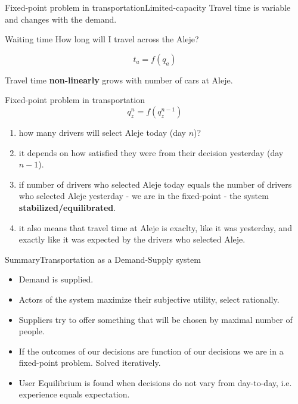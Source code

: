 \documentclass{beamer}
\begin{document}
\begin{frame}{Fixed-point problem in transportation}{Limited-capacity}
Travel time is variable and changes with the demand.
\begin{block}{Waiting time}
How long will I travel across the Aleje?
\end{block}
\begin{equation*}
t_a=f(q_a)
\end{equation*}
\begin{center}
\end{center}
Travel time \textbf{non-linearly} grows with number of cars at Aleje.
\end{frame}


\begin{frame}{Fixed-point problem in transportation}{}
\begin{equation*}
q_z^n=f(q_z^{n-1})
\end{equation*}
\begin{enumerate}
\item how many drivers will select Aleje today (day $n$)? 
\item it depends on how satisfied they were from their decision yesterday (day $n-1$).
\item if number of drivers who selected Aleje today equals the number of drivers who selected Aleje yesterday - we are in the fixed-point - the system \textbf{stabilized/equilibrated}.
\item it also means that travel time at Aleje is exaclty, like it was yesterday, and exactly like it was expected by the drivers who selected Aleje.
\end{enumerate}
\end{frame}

\begin{frame}{Summary}{Transportation as a Demand-Supply system}
\begin{itemize}
\item Demand is supplied. 
\item Actors of the system maximize their subjective utility, select rationally.
\item Suppliers try to offer something that will be chosen by maximal number of people.
\item If the outcomes of our decisions are function of our decisions we are in a fixed-point problem. Solved iteratively.
\item User Equilibrium is found when decisions do not vary from day-to-day, i.e. experience equals expectation.
\end{itemize}
\end{frame}
\end{document}
